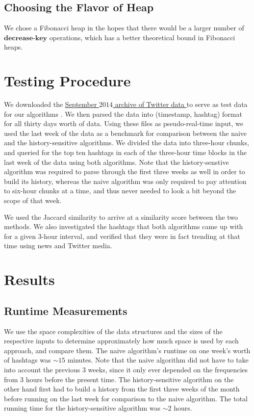 \documentclass[twoside]{article}
\newcommand{\cc}[1]
 {\textbf{\cite{#1}}}
\begin{document}
{\subsection{Choosing the Flavor of Heap}

We chose a Fibonacci heap in the hopes that there would be a larger number of $\textbf{decrease-key}$ operations, which has a better theoretical bound in Fibonacci heaps. 


\section{Testing Procedure}

We downloaded the \href{https://archive.org/details/twitterstream}{September $2014$ archive of Twitter data } to serve as test data for our algorithms \cc{Twitter2014}. We then parsed the data into (timestamp, hashtag) format
for all thirty days worth of data. Using these files as pseudo-real-time input, we used the last week of the data as a benchmark for comparison between the naive and the history-sensitive algorithms. We divided the data into three-hour chunks, and queried for the top ten hashtags in each of the three-hour time blocks
in the last week of the data using both algorithms. Note that the history-senstive algorithm was required to parse through the first three weeks as well in order to build its history, whereas the naive algorithm was only required to pay attention to six-hour chunks at a time, and thus never needed to look a bit beyond the scope of that week. 

We used the Jaccard similarity to arrive at a similarity score between the two methods. We also investigated the hashtags that both algorithms came up with for a given $3$-hour interval, and verified
that they were in fact trending at that time using news and Twitter media. 


\section{Results}

\subsection{Runtime Measurements}

We use the space complexities of the data structures and the sizes of the 
respective inputs to determine approximately how much space is used by each
approach, and compare them. The naive algorithm's runtime on one week's worth
of hashtags was $\sim 15$ minutes. Note that the naive algorithm did not have 
to take into account the previous $3$ weeks, since it only ever depended on 
the frequencies from $3$ hours before the present time. The history-sensitive
algorithm on the other hand first had to build a history from the first three
weeks of the month before running on the last week for comparison to the naive
algorithm. The total running time for the history-sensitive algorithm was $
\sim 2$ hours.

}
\end{document}
